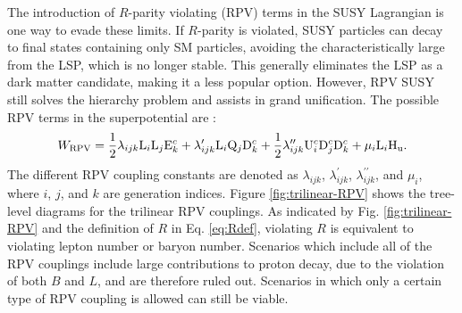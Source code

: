 The introduction of $R$-parity violating (RPV) terms in the SUSY Lagrangian is one way to evade these limits. If $R$-parity is violated, SUSY particles can decay to final states containing only SM particles, avoiding the characteristically large \met from the LSP, which is no longer stable. This generally eliminates the LSP as a dark matter candidate, making it a less popular option. However, RPV SUSY still solves the hierarchy problem and assists in grand unification. The possible RPV terms in the superpotential are \cite{Barbier}:
\begin{equation}
W_{\text{RPV}} = \frac{1}{2}\lambda_{ijk}\mathrm{L}_{i}\mathrm{L}_{j}\mathrm{E}_{k}^{c} + \lambda_{ijk}^{\prime}\mathrm{L}_{i}\mathrm{Q}_{j}\mathrm{D}_{k}^{c} + \frac{1}{2}\lambda_{ijk}^{\prime \prime}\mathrm{U}_{i}^{c}\mathrm{D}_{j}^{c}\mathrm{D}_{k}^{c} + \mu_{i}\mathrm{L}_{i}\mathrm{H}_\mathrm{u}. \label{eq:WRPV}
\end{equation}
The different RPV coupling constants are denoted as $\lambda_{ijk}$, $\lambda^{\prime}_{ijk}$, $\lambda^{\prime \prime}_{ijk}$, and $\mu_{i}$, where $i$, $j$, and $k$ are generation indices. Figure \ref{fig:trilinear-RPV} shows the tree-level diagrams for the trilinear RPV couplings. As indicated by Fig. \ref{fig:trilinear-RPV} and the definition of $R$ in Eq. \eqref{eq:Rdef}, violating $R$ is equivalent to violating lepton number or baryon number. Scenarios which include all of the RPV couplings include large contributions to proton decay, due to the violation of both $B$ and $L$, and are therefore ruled out. Scenarios in which only a certain type of RPV coupling is allowed can still be viable.

